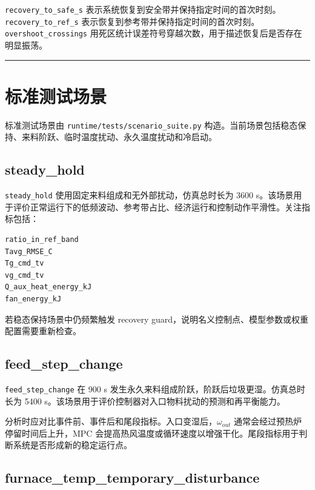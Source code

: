 \documentclass[UTF8,openany,zihao=-4,oneside]{ctexbook}
\providecommand{\passthrough}[1]{#1}
\newcommand{\manualdivider}{\par\vspace{0.6em}\noindent\textcolor{FGLine}{\rule{\linewidth}{0.7pt}}\vspace{0.6em}\par}
\begin{document}
\passthrough{\lstinline!recovery_to_safe_s!} 表示系统恢复到安全带并保持指定时间的首次时刻。\passthrough{\lstinline!recovery_to_ref_s!} 表示恢复到参考带并保持指定时间的首次时刻。\passthrough{\lstinline!overshoot_crossings!} 用死区统计误差符号穿越次数，用于描述恢复后是否存在明显振荡。

\manualdivider

\section{标准测试场景}\label{sec:standard-test-cases}

标准测试场景由 \passthrough{\lstinline!runtime/tests/scenario_suite.py!} 构造。当前场景包括稳态保持、来料阶跃、临时温度扰动、永久温度扰动和冷启动。

\subsection{steady\_hold}\label{subsec:test-steady-hold}

\passthrough{\lstinline!steady_hold!} 使用固定来料组成和无外部扰动，仿真总时长为 3600 s。该场景用于评价正常运行下的低频波动、参考带占比、经济运行和控制动作平滑性。关注指标包括：

\begin{lstlisting}
ratio_in_ref_band
Tavg_RMSE_C
Tg_cmd_tv
vg_cmd_tv
Q_aux_heat_energy_kJ
fan_energy_kJ
\end{lstlisting}

若稳态保持场景中仍频繁触发 recovery guard，说明名义控制点、模型参数或权重配置需要重新检查。

\subsection{feed\_step\_change}\label{subsec:test-feed-step}

\passthrough{\lstinline!feed_step_change!} 在 900 s 发生永久来料组成阶跃，阶跃后垃圾更湿。仿真总时长为 5400 s。该场景用于评价控制器对入口物料扰动的预测和再平衡能力。

分析时应对比事件前、事件后和尾段指标。入口变湿后，\(\omega_{out}\) 通常会经过预热炉停留时间后上升，MPC 会提高热风温度或循环速度以增强干化。尾段指标用于判断系统是否形成新的稳定运行点。

\subsection{furnace\_temp\_temporary\_disturbance}\label{subsec:test-temporary-disturbance}
\end{document}

